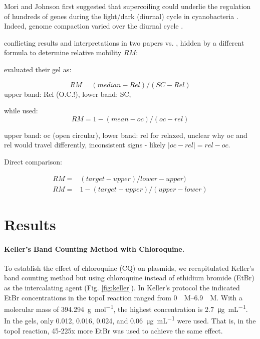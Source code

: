 \documentclass[10pt,letterpaper]{article}
\newcommand{\ugml}{\micro\gram\per\milli\liter}
\newcommand{\uM}{\micro\textsc{M}}%
\begin{document}
Mori and Johnson first suggested that supercoiling could underlie the
regulation of hundreds of genes during the light/dark (diurnal) cycle
in cyanobacteria \cite{Mori2001}. Indeed, genome compaction varied
over the diurnal cycle \cite{Smith2006}. 

conflicting results and interpretations in two papers
\cite{Woelfle2007} vs. \cite{Vijayan2009},
hidden by a different formula to determine relative mobility $RM$:

\cite{Woelfle2007} evaluated their gel as:

\begin{equation}
  RM = (median - Rel)/(SC - Rel)
\end{equation}
upper band: Rel (O.C.!), lower band: SC,

while \cite{Vijayan2009} used: 
\begin{equation}
  RM = 1 - (mean - oc)/(oc - rel)
\end{equation}

upper band: oc (open circular), lower band: rel for relaxed,
unclear why oc and rel would travel differently,
inconsistent signs - likely $|oc-rel|=rel-oc$.
       
Direct comparison:

\begin{align}
  RM =& (target - upper)/lower - upper)\\
  RM =& 1 - (target - upper)/(upper - lower)
\end{align}




\section{Results}

\paragraph{Keller's Band Counting Method with Chloroquine.}
To establish the effect of chloroquine (CQ) on plasmids, we
recapitulated Keller's band counting method but using chloroquine
instead of ethidium bromide (EtBr) as the intercalating agent
(Fig. \ref{fig:keller}).
%
In Keller's protocol \cite{Keller1975b} the indicated EtBr
concentrations in the topoI reaction ranged from
\SIrange{0}{6.9}{\uM}. With a molecular mass of
\SI{394.294}{\gram\per\mol}, the highest concentration is
\SI{2.7}{\ugml}. In the gels, only \num{0.012}, \num{0.016},
\num{0.024}, and \SI{0.06}{\ugml} were used. That is, in the topoI
reaction, 45-225x more EtBr was used to achieve the same effect.
\end{document}
